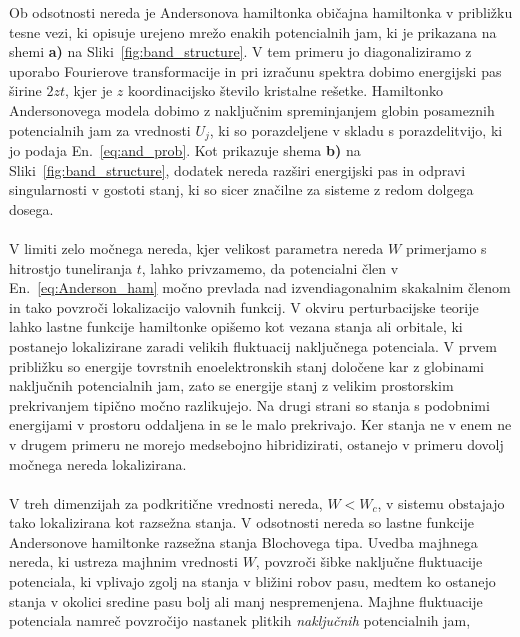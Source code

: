 \documentclass[10pt,a4paper]{article}
\begin{document}
\noindent 
\begin{minipage}[t]{0.56\textwidth} 
Ob odsotnosti nereda je Andersonova hamiltonka običajna hamiltonka v približku tesne vezi, ki opisuje urejeno mrežo enakih potencialnih jam, ki je prikazana na shemi \textbf{a)} na Sliki~\ref{fig:band_structure}.  V tem primeru jo diagonaliziramo z uporabo Fourierove transformacije in pri izračunu spektra dobimo energijski pas širine $2zt$, kjer je $z$ koordinacijsko število kristalne rešetke. Hamiltonko Andersonovega modela dobimo z naključnim spreminjanjem globin posameznih potencialnih jam za vrednosti $U_j$, ki so porazdeljene v skladu s porazdelitvijo, ki jo podaja En.~\eqref{eq:and_prob}. Kot prikazuje shema \textbf{b)} na Sliki~\ref{fig:band_structure}, dodatek nereda razširi energijski pas in odpravi singularnosti v gostoti stanj, ki so sicer značilne za sisteme z redom dolgega dosega. \\\\
V limiti zelo močnega nereda, kjer velikost parametra nereda $W$ primerjamo s hitrostjo tuneliranja $t$, lahko privzamemo, da potencialni člen v En.~\eqref{eq:Anderson_ham} močno prevlada nad izvendiagonalnim skakalnim členom in tako povzroči lokalizacijo valovnih funkcij. V okviru perturbacijske teorije lahko lastne funkcije hamiltonke opišemo kot vezana stanja ali orbitale, ki postanejo lokalizirane zaradi velikih fluktuacij naključnega potenciala. V prvem približku so energije tovrstnih enoelektronskih stanj določene kar z globinami naključnih potencialnih jam, zato se energije stanj z velikim prostorskim prekrivanjem tipično močno razlikujejo. Na drugi strani so stanja s podobnimi energijami v prostoru oddaljena in se le malo prekrivajo. Ker stanja ne v enem ne v drugem primeru ne morejo medsebojno hibridizirati, ostanejo v primeru dovolj močnega nereda lokalizirana. \\\\
V treh dimenzijah za podkritične vrednosti nereda, $W<W_c$, v sistemu obstajajo tako lokalizirana kot razsežna stanja. V odsotnosti nereda so lastne funkcije Andersonove hamiltonke razsežna stanja Blochovega tipa. Uvedba majhnega nereda, ki ustreza majhnim vrednosti $W$, povzroči šibke naključne fluktuacije potenciala, ki vplivajo zgolj na stanja v bližini robov pasu, medtem ko ostanejo stanja v okolici sredine pasu bolj ali manj nespremenjena. Majhne fluktuacije potenciala namreč povzročijo nastanek plitkih \emph{naključnih} potencialnih jam, 
\end{minipage}\hfill
\end{document}
